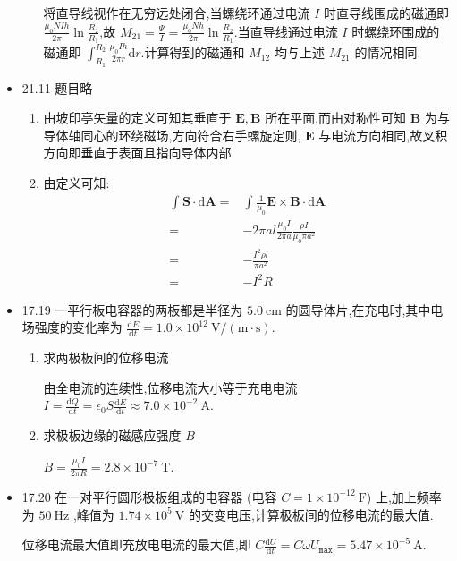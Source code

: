 \begin{itemize}
\begin{enumerate}
                    将直导线视作在无穷远处闭合,当螺绕环通过电流 $I$ 时直导线围成的磁通即 $\frac{\mu_0 NIh}{2\pi }\ln \frac{R_2}{R_1}$,故 $M_{21}=\frac{\Psi}{I}=\frac{\mu_0 Nh}{2\pi }\ln \frac{R_2}{R_1}$.当直导线通过电流 $I$ 时螺绕环围成的磁通即 $\int_{R_1}^{R_2}\frac{\mu_0 Ih}{2\pi r}\mathrm{d}r$.计算得到的磁通和 $M_{12}$ 均与上述 $M_{21}$ 的情况相同.
            \end{enumerate}
        \item 21.11 题目略
            \begin{enumerate}
                \item 由坡印亭矢量的定义可知其垂直于 $\bm{E},\bm{B}$ 所在平面,而由对称性可知 $\bm{B}$ 为与导体轴同心的环绕磁场,方向符合右手螺旋定则, $\bm{E}$ 与电流方向相同,故叉积方向即垂直于表面且指向导体内部.
                \item 由定义可知:
                    \begin{align}
                        \int_{}^{}\bm{S}\cdot \mathrm{d}\bm{A}=&\int_{}^{}\frac{1}{\mu_0}\bm{E}\times \bm{B}\cdot \mathrm{d}\bm{A}\nonumber\\
                        =&-2\pi a l \frac{\mu_0 I}{2\pi a}\frac{\rho I}{\mu_0\pi a^2}\nonumber\\
                        =&-\frac{I^2\rho l}{\pi a^2}\nonumber\\
                        =&-I^2R\nonumber
                    \end{align}
            \end{enumerate}
        \item 17.19 一平行板电容器的两板都是半径为 $5.0 \ \mathrm{cm}$ 的圆导体片,在充电时,其中电场强度的变化率为 $\frac{\mathrm{d}E}{\mathrm{d}t}=1.0\times 10^{12} \ \mathrm{V / (m\cdot s)}$.
            \begin{enumerate}
                \item 求两极板间的位移电流

                    由全电流的连续性,位移电流大小等于充电电流 $I=\frac{\mathrm{d}Q}{\mathrm{d}t}=\epsilon_0 S \frac{\mathrm{d}E}{\mathrm{d}t}\approx 7.0\times 10^{-2} \ \mathrm{A}$.
                \item 求极板边缘的磁感应强度 $B$

                    $B=\frac{\mu_0I}{2\pi R}=2.8\times 10^{-7} \ \mathrm{T}$.
            \end{enumerate}
        \item 17.20 在一对平行圆形极板组成的电容器 (电容 $C=1\times 10^{-12} \ \mathrm{F}$) 上,加上频率为 $50  \ \mathrm{Hz}$ ,峰值为 $1.74\times 10^{5} \ \mathrm{V}$ 的交变电压,计算极板间的位移电流的最大值.

            位移电流最大值即充放电电流的最大值,即 $C \frac{\mathrm{d}U}{\mathrm{d}t}=C\omega U_{\texttt{max}}=5.47\times 10^{-5} \ \mathrm{A}$.
    \end{itemize}

